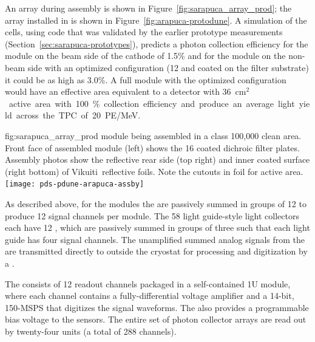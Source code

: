 An  array during assembly is shown in Figure~\ref{fig:sarapuca_array_prod}; the array installed in  is shown in Figure~\ref{fig:arapuca-protodune}. 
A simulation of the  cells, using code that was validated by the earlier prototype measurements (Section~\ref{sec:sarapuca-prototypes}), predicts a photon collection efficiency for the module on the beam side of the cathode of 1.5\% and for the module on the non-beam side with an optimized configuration (\num{12}  and  coated on the filter substrate) it could be as high as 3.0\%. A full  module with the optimized configuration would have an effective area equivalent to a detector with \SI{36}{cm$^2$} active area with 100\% collection efficiency and produce an average light yield across the TPC of \SI{20}{PE/MeV}.


\begin{dunefigure}{fig:sarapuca_array_prod}
{  module being assembled in a class 100,000 clean area.  Front face of assembled module (left) shows the 16 coated dichroic filter plates.  Assembly photos show the reflective rear side (top right) and inner coated surface (right bottom) of Vikuiti\texttrademark\ reflective foils.  Note the cutouts in foil for  active area.}
	\texttt{[image: pds-pdune-arapuca-assby]}
\end{dunefigure}



As described above, for the  modules the  are passively summed in groups of 12 to produce 12 signal channels per module. The 58 light guide-style light collectors each have 12 , which are passively summed in groups of three such that each light guide has four signal channels. 
The unamplified summed analog signals from the  are transmitted directly to outside the cryostat for processing and digitization by a
.

The  consists of 12 readout channels packaged in  a self-contained 1U module, where each channel contains a fully-differential voltage amplifier and a \num{14}-bit, \num{150}-MSPS  that digitizes the  signal waveforms. The  also provides a programmable bias voltage to the sensors.
The entire set of photon collector arrays are read out by twenty-four  units (a total of 288 channels).



